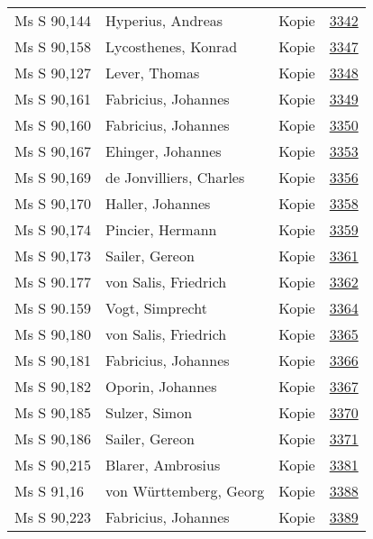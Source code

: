 \documentclass[10pt,a4paper,landscape]{report}
\begin{document}
\begin{longtable}{p{16cm}p{4cm}lr}
Ms S 90,144	&	Hyperius, Andreas	&	Kopie	&	\href{http://130.60.24.72/assignment/3342}{3342}\\
Ms S 90,158	&	Lycosthenes, Konrad	&	Kopie	&	\href{http://130.60.24.72/assignment/3347}{3347}\\
Ms S 90,127	&	Lever, Thomas	&	Kopie	&	\href{http://130.60.24.72/assignment/3348}{3348}\\
Ms S 90,161	&	Fabricius, Johannes	&	Kopie	&	\href{http://130.60.24.72/assignment/3349}{3349}\\
Ms S 90,160	&	Fabricius, Johannes	&	Kopie	&	\href{http://130.60.24.72/assignment/3350}{3350}\\
Ms S 90,167	&	Ehinger, Johannes	&	Kopie	&	\href{http://130.60.24.72/assignment/3353}{3353}\\
Ms S 90,169	&	de Jonvilliers, Charles	&	Kopie	&	\href{http://130.60.24.72/assignment/3356}{3356}\\
Ms S 90,170	&	Haller, Johannes	&	Kopie	&	\href{http://130.60.24.72/assignment/3358}{3358}\\
Ms S 90,174	&	Pincier, Hermann	&	Kopie	&	\href{http://130.60.24.72/assignment/3359}{3359}\\
Ms S 90,173	&	Sailer, Gereon	&	Kopie	&	\href{http://130.60.24.72/assignment/3361}{3361}\\
Ms S 90.177	&	von Salis, Friedrich	&	Kopie	&	\href{http://130.60.24.72/assignment/3362}{3362}\\
Ms S 90.159	&	Vogt, Simprecht	&	Kopie	&	\href{http://130.60.24.72/assignment/3364}{3364}\\
Ms S 90,180	&	von Salis, Friedrich	&	Kopie	&	\href{http://130.60.24.72/assignment/3365}{3365}\\
Ms S 90,181	&	Fabricius, Johannes	&	Kopie	&	\href{http://130.60.24.72/assignment/3366}{3366}\\
Ms S 90,182	&	Oporin, Johannes	&	Kopie	&	\href{http://130.60.24.72/assignment/3367}{3367}\\
Ms S 90,185	&	Sulzer, Simon	&	Kopie	&	\href{http://130.60.24.72/assignment/3370}{3370}\\
Ms S 90,186	&	Sailer, Gereon	&	Kopie	&	\href{http://130.60.24.72/assignment/3371}{3371}\\
Ms S 90,215	&	Blarer, Ambrosius	&	Kopie	&	\href{http://130.60.24.72/assignment/3381}{3381}\\
Ms S 91,16	&	von Württemberg, Georg	&	Kopie	&	\href{http://130.60.24.72/assignment/3388}{3388}\\
Ms S 90,223	&	Fabricius, Johannes	&	Kopie	&	\href{http://130.60.24.72/assignment/3389}{3389}\\

\end{longtable}
\end{document}
